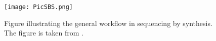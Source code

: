 \begin{figure}
\centering
\texttt{[image: PicSBS.png]}
\caption{Figure illustrating the general workflow in sequencing by synthesis. The figure is taken from \citet{NGS}. \label{Workflowww}}
\end{figure}

